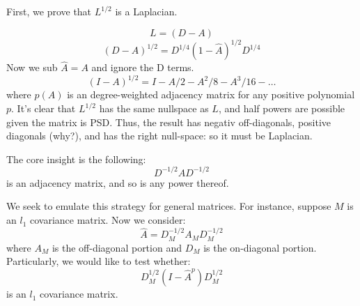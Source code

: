 First, we prove that $L^{1/2}$ is a Laplacian.

\[ L = (D-A) \]
\[ (D-A)^{1/2} = D^{1/4} (1-\hat{A})^{1/2} D^{1/4} \]
Now we sub $\hat{A} = A$ and ignore the D terms.
\[ (I-A)^{1/2} = I - A/2 - A^2/8 - A^3/16 - \ldots \]
where $p(A)$ is an degree-weighted adjacency matrix for any
positive polynomial $p$.  It's clear that $L^{1/2}$ has the same
nullspace as $L$, and half powers are possible given the matrix
is PSD. Thus, the result has negativ off-diagonals, positive
diagonals (why?), and has the right null-space: so it must be
Laplacian.
 
The core insight is the following: 
\[D^{-1/2} A D^{-1/2}\]
is an adjacency matrix, and so is any power thereof.

We seek to emulate this strategy for general matrices. For
instance, suppose $M$ is an $l_1$ covariance matrix. Now we
consider:
\[ \widehat{A} = D_M^{-1/2} A_M D_M^{-1/2} \] where $A_M$ is the off-diagonal
portion and $D_M$ is the on-diagonal portion.
Particularly, we would like to test whether:
\[ D_M^{1/2} (I-\widehat{A}^p)D_M^{1/2} \]  is an $l_1$
covariance matrix.

